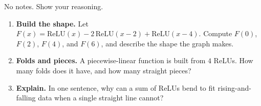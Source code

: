 \documentclass[10pt]{article}
\newcommand{\relu}{\mathrm{ReLU}}
\begin{document}
\namedateperiod

\vspace{0.15in}

No notes. Show your reasoning.

\begin{enumerate}[leftmargin=1.8em, itemsep=16pt]
  \item \textbf{Build the shape.} Let $F(x)=\relu(x)-2\,\relu(x-2)+\relu(x-4)$. Compute
        $F(0)$, $F(2)$, $F(4)$, and $F(6)$, and describe the shape the graph makes.
        \vspace{1.5cm}
  \item \textbf{Folds and pieces.} A piecewise-linear function is built from $4$ ReLUs. How many folds does
        it have, and how many straight pieces?
        \vspace{1.1cm}
  \item \textbf{Explain.} In one sentence, why can a sum of ReLUs bend to fit rising-and-falling data when a
        single straight line cannot?
\end{enumerate}
\end{document}
